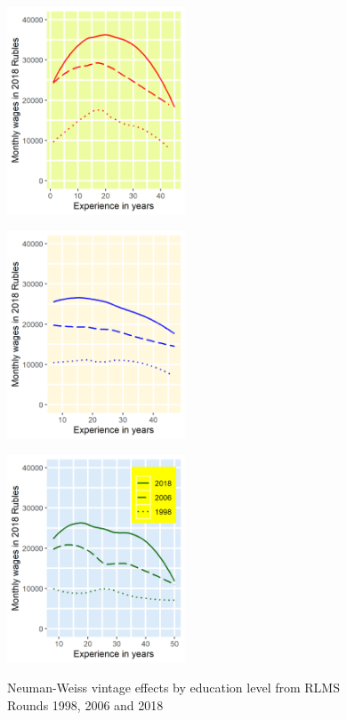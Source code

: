 \documentclass[alpha-refs]{wiley-article-02b}
\begin{document}
	\begin{figure}[htbp!]
\hspace{0.35in}
		\begin{minipage}[b]{.3\linewidth}
			\centering
			\hspace*{-0.7in}
			\includegraphics[width=150pt]{dp01_he.png}
			\label{fig:1.1a}
		\end{minipage}
		\hfill
		\begin{minipage}[b]{.3\linewidth}
			\centering
			\hspace*{-0.7in}
			\includegraphics[width=150pt]{dp01_ve.png}
			\label{fig:1.1b}
		\end{minipage}
		\hfill
		\begin{minipage}[b]{.3\linewidth}
			\centering
			\hspace*{-0.7in}
			\includegraphics[width=150pt]{dp01_se.png}
			\label{fig:1.1c}
		\end{minipage}
		\caption{Neuman-Weiss vintage effects by education level from RLMS Rounds 1998, 2006 and 2018}\label{fig:1.1}
	\end{figure}
	
\end{document}
